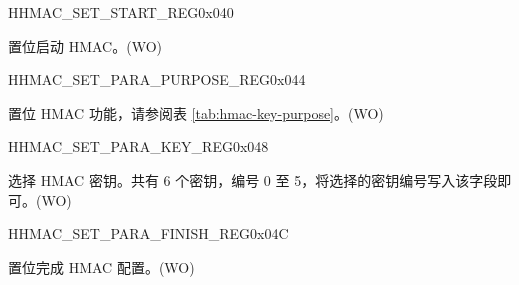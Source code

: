 \begin{register}{H}{HMAC\_SET\_START\_REG}{0x{}040}\label{regdesc:HMACSETSTARTREG}
%
%
\regnewline%
\begin{regdesc}\begin{reglist}
\label{fielddesc:HMACSETSTART}\item [HMAC\_SET\_START] 置位启动 HMAC。(WO)
\end{reglist}\end{regdesc}
\end{register}


\begin{register}{H}{HMAC\_SET\_PARA\_PURPOSE\_REG}{0x{}044}\label{regdesc:HMACSETPARAPURPOSEREG}
%
%
\regnewline%
\begin{regdesc}\begin{reglist}
\label{fielddesc:HMACPURPOSESET}\item [HMAC\_PURPOSE\_SET] 置位 HMAC 功能，请参阅表 \ref{tab:hmac-key-purpose}。(WO)
\end{reglist}\end{regdesc}
\end{register}


\begin{register}{H}{HMAC\_SET\_PARA\_KEY\_REG}{0x{}048}\label{regdesc:HMACSETPARAKEYREG}
%
%
\regnewline%
\begin{regdesc}\begin{reglist}
\label{fielddesc:HMACKEYSET}\item [HMAC\_KEY\_SET] 选择 HMAC 密钥。共有 6 个密钥，编号 0 至 5，将选择的密钥编号写入该字段即可。(WO)
\end{reglist}\end{regdesc}
\end{register}


\begin{register}{H}{HMAC\_SET\_PARA\_FINISH\_REG}{0x{}04C}\label{regdesc:HMACSETPARAFINISHREG}
%
%
\regnewline%
\begin{regdesc}\begin{reglist}
\label{fielddesc:HMACSETPARAEND}\item [HMAC\_SET\_PARA\_END] 置位完成 HMAC 配置。(WO)
\end{reglist}\end{regdesc}
\end{register}


